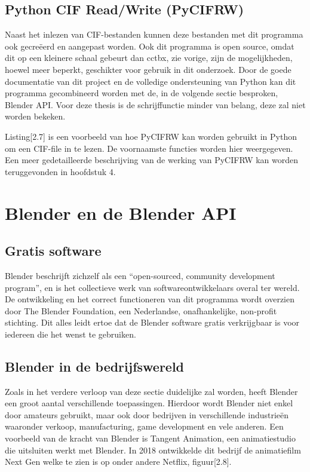 \subsection{Python CIF Read/Write (PyCIFRW)}
Naast het inlezen van CIF-bestanden kunnen deze bestanden met dit programma ook gecreëerd en aangepast worden. Ook dit programma is open source, omdat dit op een kleinere schaal gebeurt dan cctbx, zie vorige, zijn de mogelijkheden, hoewel meer beperkt, geschikter voor gebruik in dit onderzoek. Door de goede documentatie van dit project en de volledige ondersteuning van Python kan dit programma gecombineerd worden met de, in de volgende sectie besproken, Blender API. \citep*{PYCIFRW1} Voor deze thesis is de schrijffunctie minder van belang, deze zal niet worden bekeken. 

\lstset{caption = Werken met PyCIFRW in Python3}


\par 
Listing[2.7] is een voorbeeld van hoe PyCIFRW kan worden gebruikt in Python om een CIF-file in te lezen. De voornaamste functies worden hier weergegeven. Een meer gedetailleerde beschrijving van de werking van PyCIFRW kan worden teruggevonden in hoofdstuk 4.

\section{Blender en de Blender API}

\subsection{Gratis software}
Blender beschrijft zichzelf als een \enquote{open-sourced, community development program}, en is het collectieve werk van softwareontwikkelaars overal ter wereld. \citep*{BLEN1} De ontwikkeling en het correct functioneren van dit programma wordt overzien door The Blender Foundation, een Nederlandse, onafhankelijke, non-profit stichting. Dit alles leidt ertoe dat de Blender software gratis verkrijgbaar is voor iedereen die het wenst te gebruiken.

\subsection{Blender in de bedrijfswereld}
Zoals in het verdere verloop van deze sectie duidelijke zal worden, heeft Blender een groot aantal verschillende toepassingen. Hierdoor wordt Blender niet enkel door amateurs gebruikt, maar ook door bedrijven in verschillende industrieën waaronder verkoop, manufacturing, game development en vele anderen. Een voorbeeld van de kracht van Blender is Tangent Animation, een animatiestudio die uitsluiten werkt met Blender. In 2018 ontwikkelde dit bedrijf de animatiefilm Next Gen welke te zien is op onder andere Netflix, figuur[2.8].
\par

